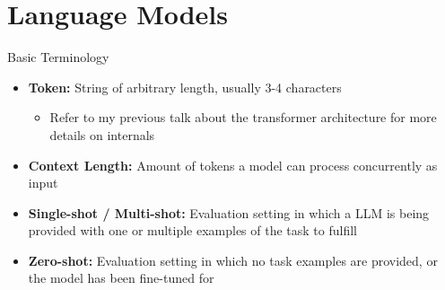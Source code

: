 \section{Language Models}

\begin{frame}[c]{Basic Terminology}
    \large
    \begin{itemize}[<+(1)->]
        \item   \textbf{Token:} String of arbitrary length, usually 3-4 characters
            \begin{itemize}
                \item Refer to my previous talk about the transformer architecture for more details on internals
            \end{itemize}
        \item   \textbf{Context Length:} Amount of tokens a model can process concurrently as input
        \item   \textbf{Single-shot / Multi-shot:} Evaluation setting in which a \gls{LLM} is being provided with one or multiple examples of the task to fulfill
        \item   \textbf{Zero-shot:} Evaluation setting in which no task examples are provided, or the model has been fine-tuned for
    \end{itemize}
\end{frame}


